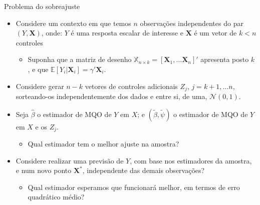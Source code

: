 \documentclass[11pt]{beamer}
\begin{document}
\begin{frame}{Problema do sobreajuste}
	\begin{itemize}
		\item Considere um contexto em que temos $n$ observações independentes do par $(Y,\boldsymbol{X})$, onde: $Y$ é uma resposta escalar de interesse e $\boldsymbol{X}$ é um vetor de $k < n$ controles 
		\begin{itemize}
			\item Suponha que a matriz de desenho $\mathbb{X}_{n\times k} = [\boldsymbol{X}_1 , \ldots \boldsymbol{X}_n]'$ apresenta posto $k$, e que $\mathbb{E}[Y_i|\boldsymbol{X}_i] = \gamma'\boldsymbol{X}_i$.
		\end{itemize}
		\item Considere gerar  $n - k$ vetores de controles adicionais $Z_j$, $j=k+1,\ldots n$, sorteando-os independentemente dos dados e entre si, de uma, $\mathcal{N}(0,1)$.
		\item Seja $\hat{\beta}$ o estimador de MQO de $Y$ em $X$; e $(\tilde{\beta}, \tilde{\psi})$ o estimador de MQO de $Y$ em $X$ e os $Z_j$.
		\begin{itemize}
			\item Qual estimador tem o melhor ajuste na amostra?
		\end{itemize}
		\item Considere realizar uma previsão de $Y$, com base nos estimadores da amostra, e num novo ponto $\boldsymbol{X}^*$, independente das demais observações?
		\begin{itemize}
			\item Qual estimador esperamos que funcionará melhor, em termos de erro quadrático médio?
		\end{itemize}
	\end{itemize}
\end{frame}
\end{document}
